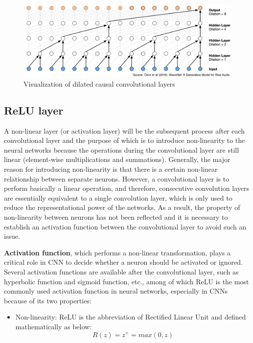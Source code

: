 \documentclass[]{krantz}
\providecommand{\tightlist}{%
  \setlength{\itemsep}{0pt}\setlength{\parskip}{0pt}}
\begin{document}
\begin{figure}[ht]

{\centering \includegraphics[width=0.65\linewidth]{figures/01-03-cnns-and-their-applications-in-nlp/Temporal} 

}

\caption{Visualization of dilated causal convolutional layers}\label{fig:figs-dilated}
\end{figure}

\hypertarget{relu-layer}{%
\subsection{ReLU layer}\label{relu-layer}}

A non-linear layer (or activation layer) will be the subsequent process after each convolutional layer and the purpose of which is to introduce non-linearity to the neural networks because the operations during the convolutional layer are still linear (element-wise multiplications and summations). Generally, the major reason for introducing non-linearity is that there is a certain non-linear relationship between separate neurons. However, a convolutional layer is to perform basically a linear operation, and therefore, consecutive convolution layers are essentially equivalent to a single convolution layer, which is only used to reduce the representational power of the networks. As a result, the property of non-linearity between neurons has not been reflected and it is necessary to establish an activation function between the convolutional layer to avoid such an issue.

\textbf{Activation function}, which performs a non-linear transformation, plays a critical role in CNN to decide whether a neuron should be activated or ignored. Several activation functions are available after the convolutional layer, such as hyperbolic function and sigmoid function, etc., among of which ReLU is the most commonly used activation function in neural networks, especially in CNNs\citep{Krizhevsky2012ImageNetCW} because of its two properties:

\begin{itemize}
\tightlist
\item
  Non-linearity: ReLU is the abbreviation of Rectified Linear Unit and defined mathematically as below:
  \[ R(z)=z^{+}= max(0,z)\]
\end{itemize}
\end{document}

